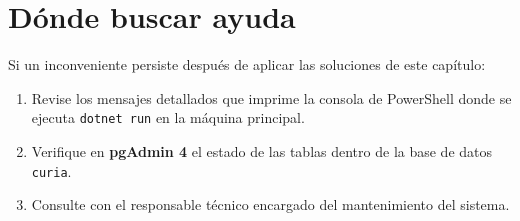 \section{Dónde buscar ayuda}
Si un inconveniente persiste después de aplicar las soluciones de este capítulo:
\begin{enumerate}
    \item Revise los mensajes detallados que imprime la consola de PowerShell donde se ejecuta \texttt{dotnet run} en la máquina principal.
    \item Verifique en \textbf{pgAdmin 4} el estado de las tablas dentro de la base de datos \texttt{curia}.
    \item Consulte con el responsable técnico encargado del mantenimiento del sistema.
\end{enumerate}
